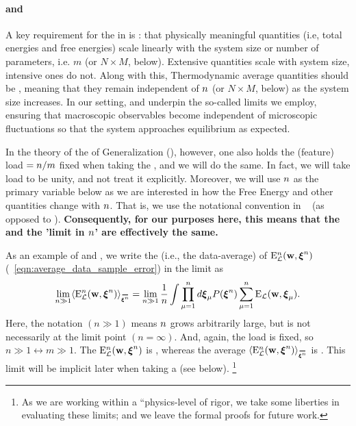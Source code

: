 \paragraph{\SizeExtensivity and \SizeIntensivity}
A key requirement for the \ThermodynamicLimit in \STATMECH is \emph{\SizeExtensivity}:
that physically meaningful quantities (i.e, total energies and free energies)
scale linearly with the system size or number of parameters, i.e. $m$ (or $N\times M$, below).
Extensive quantities scale with system size, intensive ones do not.
Along with this, Thermodynamic average quantities should be \emph{\SizeIntensive},
meaning that they remain independent of $n$ (or $N\times M$, below) as the system size increases.
In our setting, \SizeExtensivity and \SizeIntensivity underpin the so-called \LargeN limits we employ,
ensuring that macroscopic observables become independent of
microscopic fluctuations so that the system approaches equilibrium as expected.

In the theory of the \StatisticalMechanics of Generalization (\SMOG), however, one also holds the (feature) load $=n/m$ fixed when taking the \ThermodynamicLimit, and we will do the same\cite{Gardner_1985, SST92, engel2001statistical,MM17_TR}. In fact, we will take load to be unity, and not treat it explicitly. 
Moreover,  we will use $n$  as the primary variable below as we are interested in how the Free Energy and other quantities change with $n$. That is, we use the notational convention in ~\cite{Solla2023} (as opposed to \cite{SST92}). \textbf{Consequently, for our purposes here, this means that the \ThermodynamicLimit and the '\LargeN limit in $n$' are effectively the same.}

As an example of \SizeExtensivity and \SizeIntensivity, 
we write the \ExpectedValue (i.e., the data-average) of \DataSampleError $\mathbf{\mathrm{E}}^{n}_{\mathcal{L}}(\mathbf{w}, \boldsymbol{\xi}^{n})$ (\EQN~\ref{eqn:average_data_sample_error})
in the \LargeN limit as
\begin{align}
  \lim_{n\gg 1} 
  \langle \DETOPXI\rangle_{\AVGNDXIn}=
  \lim_{n\gg 1}\frac{1}{\ND}
\int \prod_{\mu=1}^{\ND}d\XI_{\mu}P(\NDXIn)
  \sum_{\mu=1}^{\ND}\DEL(\WVEC,\XI_{\mu}) .
\end{align}
Here, the notation $(n \gg 1)$ means $n$ grows arbitrarily large, but is not necessarily
at the limit point $(n=\infty)$. And, again, the load is fixed, so $n\gg 1 \leftrightarrow m \gg 1$.
The \TotalDataSampleError $\mathbf{\mathrm{E}}^{n}_{\mathcal{L}}(\mathbf{w}, \boldsymbol{\xi}^{n})$ is \SizeExtensive, whereas the
average $\langle\DETOPXI\rangle_{\AVGNDXIn}$ is \SizeIntensive.
This limit will be implicit later when taking a \SaddlePointApproximation (see below).
\footnote{As we are working within a ``physics-level of rigor, we take some liberties in evaluating these \LargeN limits; and we leave the formal proofs for future work.  }


